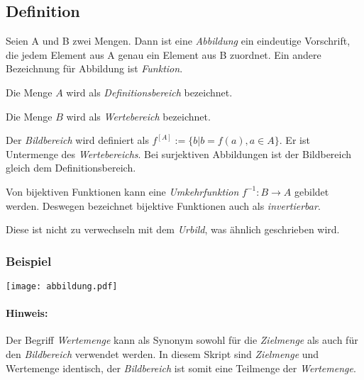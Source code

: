 \subsection{Definition}
Seien A und B zwei Mengen.
Dann ist eine \emph{Abbildung} ein eindeutige Vorschrift, die jedem Element aus A genau ein Element aus B zuordnet.
Ein andere Bezeichnung für Abbildung ist \emph{Funktion}.

Die Menge $A$ wird als \emph{Definitionsbereich} bezeichnet.

Die Menge $B$ wird als \emph{Wertebereich} bezeichnet.

Der \emph{Bildbereich} wird definiert als
$ f^{ [A] }:=\{b | b=f(a) , a \in A \}$.
Er ist Untermenge des \emph{Wertebereichs}. Bei surjektiven Abbildungen
ist der Bildbereich gleich dem Definitionsbereich.

Von bijektiven Funktionen kann eine \emph{Umkehrfunktion} $f^{-1} :
{B}\rightarrow{A} $ gebildet werden. Deswegen bezeichnet bijektive
Funktionen auch als \emph{invertierbar}.

Diese ist nicht zu verwechseln mit dem \emph{Urbild}, was ähnlich geschrieben wird.

\subsubsection*{Beispiel}
\texttt{[image: abbildung.pdf]}

\paragraph{Hinweis:}
Der Begriff \emph{Wertemenge} kann als Synonym sowohl für die \emph{Zielmenge}
als auch für den \emph{Bildbereich} verwendet werden. In diesem Skript sind
\emph{Zielmenge} und {Wertemenge} identisch, der \emph{Bildbereich} ist somit
eine Teilmenge der \emph{Wertemenge}.
